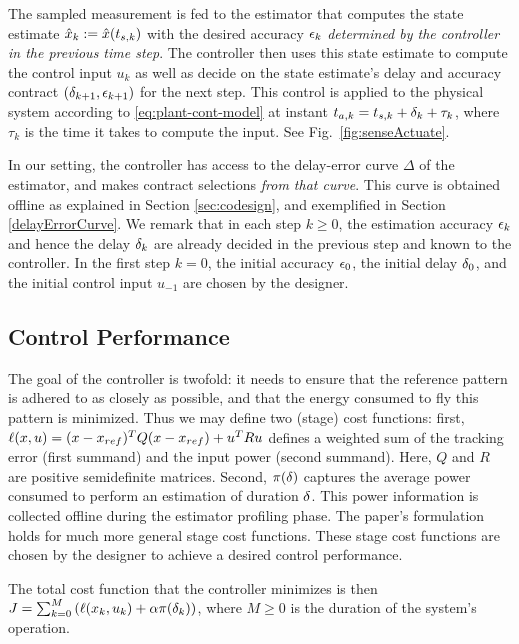 The sampled measurement is fed to the estimator that computes the state
estimate $\hat{x}_{k}:=\hat{x}(t_{s,k})$ with the desired
accuracy $\epsilon_k$ \emph{determined by the controller in the previous time step}.
The controller then uses this state estimate
to compute the control input $u_{k}$ as well as decide on the
state estimate's delay and accuracy contract $(\delta_{k+1},\epsilon_{k+1})$ for the next step.
This control is applied to the physical system according to \eqref{eq:plant-cont-model} at instant $t_{a,k} = t_{s,k}+\delta_k + \tau_k$, where $\tau_k$ is the time it takes to compute the input. 
See Fig.~\ref{fig:senseActuate}.

In our setting, the controller has access to the delay-error curve $\Delta$ of the estimator, and makes contract selections \emph{from that curve}.
This curve is obtained offline as explained in Section \ref{sec:codesign}, and exemplified in Section \ref{delayErrorCurve}.
We remark that in each step $k\geq0$, the estimation accuracy $\epsilon_k$
and hence the delay $\delta_k$ are already decided in the previous
step and known to the controller.
In the first step $k=0$, the
initial accuracy $\epsilon_0$, the initial delay $\delta_0$, and
the initial control input $u_{-1}$ are chosen by the designer.

\subsection{Control Performance}
The goal of the controller is twofold: it needs to ensure that the reference pattern is adhered to as closely as possible, and that the energy consumed to fly this pattern is minimized.
Thus we may define two (stage) cost functions: first, $\ell(x, u) = (x - x_{ref})^TQ(x - x_{ref}) + u^T R u$ defines a weighted sum of the tracking error (first summand) and the input power (second summand).
Here, $Q$ and $R$ are positive semidefinite matrices.
Second, $\pi(\delta)$ captures the average power consumed to perform an estimation of duration $\delta$.
This power information is collected offline during the estimator profiling phase.
The paper's formulation holds for much more general stage cost functions.
These stage cost functions are chosen by the designer to achieve a desired control performance.

The total cost function that the controller minimizes is then
\(
J=\sum_{k=0}^{M}\left(\ell(x_k,u_k)+ \alpha \pi(\delta_k)\right)
\),
where $M \geq 0$ is the duration of the system's operation.

